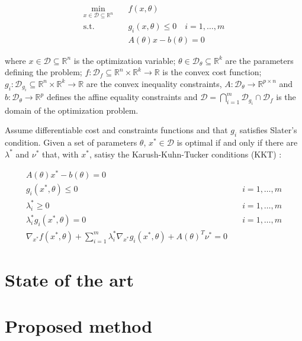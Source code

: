\documentclass[
]{article}
\begin{document}
\[
\begin{aligned}
\min_{x \in \mathcal{D} \subseteq\mathbb{R}^n} \quad &f(x, {\theta})\\
\textrm{s.t.} \quad & g_i(x, \theta) \leq 0 \quad i = 1, \dots, m \\
& A(\theta) x - b(\theta) = 0
\end{aligned}
\]

where \(x \in \mathcal{D} \subseteq\mathbb{R}^n\) is the optimization
variable; \(\theta \in \mathcal{D}_\theta \subseteq \mathbb{R}^k\) are
the parameters defining the problem;
\(f: \mathcal{D}_f \subseteq\mathbb{R}^n \times \mathbb{R}^k \to \mathbb{R}\)
is the convex cost function;
\(g_i: \mathcal{D}_{g_i} \subseteq\mathbb{R}^n \times \mathbb{R}^k \to \mathbb{R}\)
are the convex inequality constraints,
\(A: \mathcal{D}_\theta \to \mathbb{R}^{p \times n}\) and
\(b: \mathcal{D}_\theta \to \mathbb{R}^{p}\) defines the affine equality
constraints and
\(\mathcal{D} = \bigcap_{i=1}^{m} \mathcal{D}_{g_i} \cap \mathcal{D}_{f}\)
is the domain of the optimization problem.

Assume differentiable cost and constraints functions and that \(g_i\)
satisfies Slater's condition. Given a set of parameters \(\theta\),
\(x^* \in \mathcal{D}\) is optimal if and only if there are
\(\lambda^*\) and \(\nu^*\) that, with \(x^*\), satisy the
Karush-Kuhn-Tucker conditions (KKT) \citep{boydConvexOptimization2004}:

\begin{align}
    A(\theta) x^* - b(\theta) = 0&\\
    g_i(x^*, \theta) \leq 0& \quad i=1,\dots, m\\
    \lambda_i^* \geq 0& \quad i=1,\dots, m\\
    \lambda_i^* g_i(x^*, \theta) = 0& \quad i=1,\dots, m\\
    \nabla_{x^*} f(x^*, \theta) + \sum\nolimits_{i=1}^m \lambda^*_i\nabla_{x^*} g_i(x^*, \theta) + A(\theta)^T\nu^* = 0 &
\end{align}

\section{State of the art}\label{state-of-the-art}

\section{Proposed method}\label{proposed-method}
\end{document}
